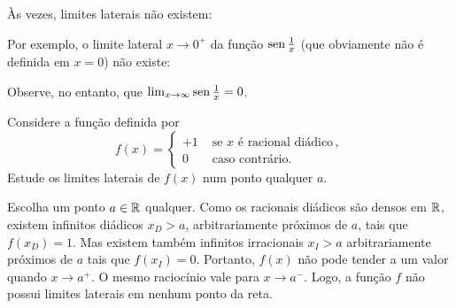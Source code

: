 Às vezes, limites laterais não existem: 
\begin{ex}
Por exemplo, o limite lateral $x\to 0^+$ da 
função $\operatorname{sen} \tfrac1x$ (que obviamente não é definida em $x=0$) 
não existe:
\begin{center}
\begin{bmlimage}\end{bmlimage}
\end{center}
Observe, no entanto, que $\lim_{x\to \infty}\operatorname{sen} \tfrac1x=0$.
\end{ex}


\begin{exo}\label{Ex:semoulediadique}
Considere a função definida por 
$$f(x)=
\begin{cases}
 +1&\text{ se $x$ é racional diádico}\,,\\
0&\text{ caso contrário}.
\end{cases}
$$
Estude os limites laterais de $f(x)$ num ponto qualquer $a$.
\begin{sol}
Escolha um ponto $a\in \mathbb{R}$ qualquer. 
Como os racionais diádicos 
são densos em $\mathbb{R}$, existem infinitos diádicos $x_D>a$, 
 arbitrariamente próximos de $a$, tais que $f(x_D)=1$. Mas existem também infinitos
irracionais $x_I>a$ arbitrariamente próximos de $a$ tais que $f(x_I)=0$. Portanto, $f(x)$
não pode tender a um valor quando $x\to a^+$. O mesmo raciocínio vale para $x\to a^-$.
Logo, a função $f$ não possui limites laterais em nenhum ponto da reta.
\end{sol}
\end{exo}


